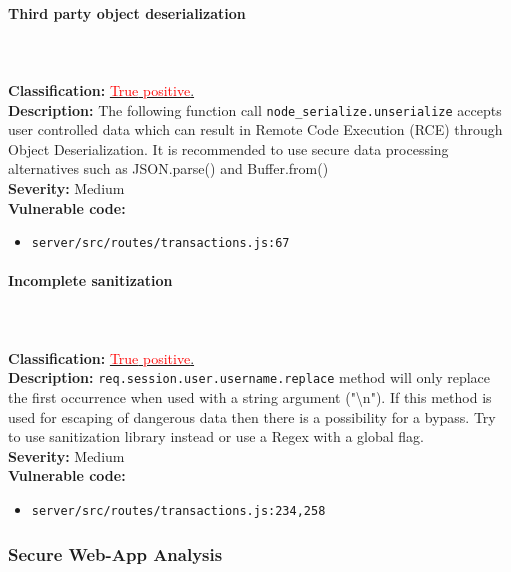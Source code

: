 \documentclass[]{article}
\begin{document}
\paragraph{Third party object deserialization} \mbox{} \\ \\
\textbf{Classification:} \hyperref[subsubsec:deserialization_of_untrusted_data]{\textcolor{red}{True} \textcolor{red}{positive}.} \\
\textbf{Description:} The following function call \texttt{node\_serialize.unserialize} accepts user controlled data which can result in Remote Code Execution (RCE) through Object Deserialization. It is recommended to use secure data processing alternatives such as JSON.parse() and Buffer.from() \\ 
\textbf{Severity:} Medium \\ 
\textbf{Vulnerable code:}
\begin{itemize}
    \item \texttt{server/src/routes/transactions.js:67}
\end{itemize}

\paragraph{Incomplete sanitization} \mbox{} \\ \\
\textbf{Classification:} \hyperref[subsubsec:improper_limitation_of_a_pathname_to_a_restricted_directory]{\textcolor{red}{True} \textcolor{red}{positive}.} \\ 
\textbf{Description:} \texttt{req.session.user.username.replace} method will only replace the first occurrence when used with a  
          string argument ("\textbackslash n"). If this method is used for escaping of dangerous data then there is a       
          possibility for a bypass. Try to use sanitization library instead or use a Regex with a global flag. \\ 
\textbf{Severity:} Medium \\ 
\textbf{Vulnerable code:}
\begin{itemize}
    \item \texttt{server/src/routes/transactions.js:234,258}
\end{itemize}

\subsubsection{Secure Web-App Analysis}
\end{document}
